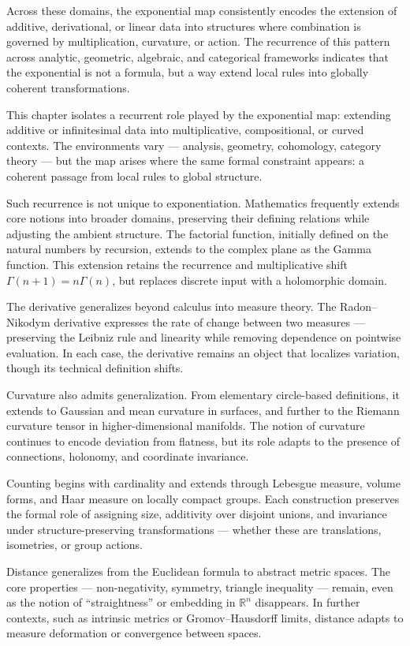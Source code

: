 Across these domains, the exponential map consistently encodes the extension of additive, derivational, or linear data into structures where combination is governed by multiplication, curvature, or action. The recurrence of this pattern across analytic, geometric, algebraic, and categorical frameworks indicates that the exponential is not a formula, but a way extend local rules into globally coherent transformations.


\begin{commentary}[Generalizations]
This chapter isolates a recurrent role played by the exponential map: extending additive or infinitesimal data into multiplicative, compositional, or curved contexts. The environments vary — analysis, geometry, cohomology, category theory — but the map arises where the same formal constraint appears: a coherent passage from local rules to global structure.

Such recurrence is not unique to exponentiation. Mathematics frequently extends core notions into broader domains, preserving their defining relations while adjusting the ambient structure. The factorial function, initially defined on the natural numbers by recursion, extends to the complex plane as the Gamma function. This extension retains the recurrence and multiplicative shift \( \Gamma(n+1) = n\Gamma(n) \), but replaces discrete input with a holomorphic domain.

The derivative generalizes beyond calculus into measure theory. The Radon–Nikodym derivative expresses the rate of change between two measures — preserving the Leibniz rule and linearity while removing dependence on pointwise evaluation. In each case, the derivative remains an object that localizes variation, though its technical definition shifts.

Curvature also admits generalization. From elementary circle-based definitions, it extends to Gaussian and mean curvature in surfaces, and further to the Riemann curvature tensor in higher-dimensional manifolds. The notion of curvature continues to encode deviation from flatness, but its role adapts to the presence of connections, holonomy, and coordinate invariance.

Counting begins with cardinality and extends through Lebesgue measure, volume forms, and Haar measure on locally compact groups. Each construction preserves the formal role of assigning size, additivity over disjoint unions, and invariance under structure-preserving transformations — whether these are translations, isometries, or group actions.

Distance generalizes from the Euclidean formula to abstract metric spaces. The core properties — non-negativity, symmetry, triangle inequality — remain, even as the notion of “straightness” or embedding in $\mathbb{R}^n$ disappears. In further contexts, such as intrinsic metrics or Gromov–Hausdorff limits, distance adapts to measure deformation or convergence between spaces.

\end{commentary}

